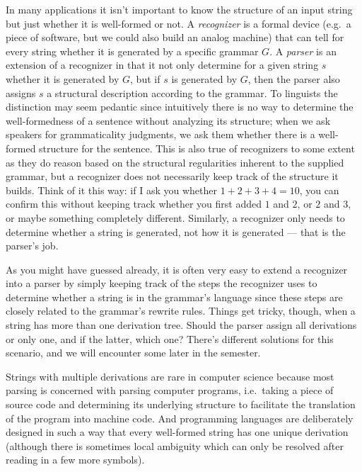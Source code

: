 In many applications it isn't important to know the structure of an input string but just whether it is well-formed or not.
A \emph{recognizer} is a formal device (e.g.\ a piece of software, but we could also build an analog machine) that can tell for every string whether it is generated by a specific grammar $G$.
A \emph{parser} is an extension of a recognizer in that it not only determine for a given string $s$ whether it is generated by $G$, but if $s$ is generated by $G$, then the parser also assigns $s$ a structural description according to the grammar.
To linguists the distinction may seem pedantic since intuitively there is no way to determine the well-formedness of a sentence without analyzing its structure;
when we ask speakers for grammaticality judgments, we ask them whether there is a well-formed structure for the sentence.
This is also true of recognizers to some extent as they do reason based on the structural regularities inherent to the supplied grammar, but a recognizer does not necessarily keep track of the structure it builds.
Think of it this way: if I ask you whether $1+2+3+4 = 10$, you can confirm this without keeping track whether you first added $1$ and $2$, or $2$ and $3$, or maybe something completely different.
Similarly, a recognizer only needs to determine whether a string is generated, not how it is generated --- that is the parser's job.

%
As you might have guessed already, it is often very easy to extend a recognizer into a parser by simply keeping track of the steps the recognizer uses to determine whether a string is in the grammar's language since these steps are closely related to the grammar's rewrite rules.
Things get tricky, though, when a string has more than one derivation tree.
Should the parser assign all derivations or only one, and if the latter, which one?
There's different solutions for this scenario, and we will encounter some later in the semester.

\begin{remark}
    Strings with multiple derivations are rare in computer science because most parsing is concerned with parsing computer programs, i.e.\ taking a piece of source code and determining its underlying structure to facilitate the translation of the program into machine code.
    And programming languages are deliberately designed in such a way that every well-formed string has one unique derivation (although there is sometimes local ambiguity which can only be resolved after reading in a few more symbols).
\end{remark}


